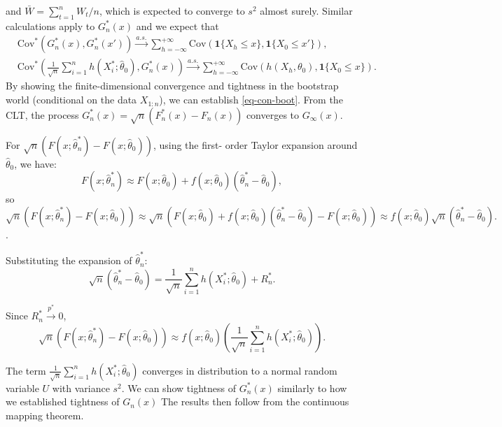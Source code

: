 \documentclass[11pt]{article}
\begin{document}
and $\bar{W}=\sum^{n}_{t=1}W_t/n$,
which is expected to converge to $s^2$ almost surely. Similar calculations apply to $G_n^*(x)$ and we expect that
\begin{align*}
&\text{Cov}^*(G_n^*(x),G_n^*(x'))\overset{a.s.}{\rightarrow}   \sum^{+\infty}_{h=-\infty}\text{Cov}(\mathbf{1}\{X_{h}\leq x\},\mathbf{1}\{X_0\leq x'\}),\\
&\text{Cov}^*\left(\frac{1}{\sqrt{n}}\sum^{n}_{i=1}h(X_i^*;\hat{\theta}_0), G_n^*(x)\right)\overset{a.s.}{\rightarrow} \sum^{+\infty}_{h=-\infty}\text{Cov}(h(X_{h},\theta_0),\mathbf{1}\{X_0\leq x\}).
\end{align*}
By showing the finite-dimensional convergence and tightness in the bootstrap world (conditional on the data $X_{1:n}$), we can establish \eqref{eq-con-boot}.
From the CLT, the process $G_n^*(x) = \sqrt{n}(F_n^*(x) - F_n(x))$ converges 
to 
$G_{\infty}(x)$.

For $\sqrt{n}(F(x;\hat{\theta}_n^*) - F(x;\hat{\theta}_0))$, using the first-
order Taylor 
expansion around $\hat{\theta}_0$, we have:
\[
F(x;\hat{\theta}_n^*) \approx F(x;\hat{\theta}_0) + f(x; 
\hat{\theta}_0) (\hat{\theta}_n^* - \hat{\theta}_0),
\] so
\[
\sqrt{n}(F(x;\hat{\theta}_n^*) - F(x;\hat{\theta}_0)) \approx \sqrt{n} 
(F(x;\hat{\theta}_0) + f(x; 
\hat{\theta}_0) (\hat{\theta}_n^* - \hat{\theta}_0) - F(x;\hat{\theta}_0)) 
\approx
f(x; 
\hat{\theta}_0) \sqrt{n} (\hat{\theta}_n^* - \hat{\theta}_0).
\].

Substituting the expansion of $\hat{\theta}_n^*$:
\[
\sqrt{n} (\hat{\theta}_n^* - \hat{\theta}_0) = \frac{1}{\sqrt{n}} \sum_{i=1}^{n} 
h(X_i^*; \hat{\theta}_0) + R_n^*.
\]

Since $R_n^* \overset{p^*}{\rightarrow} 0$, 
\[
\sqrt{n}(F(x;\hat{\theta}_n^*) - F(x;\hat{\theta}_0)) \approx 
f(x; \hat{\theta}_0) \left( \frac{1}{\sqrt{n}} \sum_{i=1}^{n} h(X_i^*; 
\hat{\theta}_0) \right).
\]

The term $\frac{1}{\sqrt{n}} \sum_{i=1}^{n} h(X_i^*; \hat{\theta}_0)$ 
converges in distribution to a normal random variable $U$ with variance 
$s^2$.
We can show tightness of $G_n^*(x)$ similarly to how we established 
tightness of $G_n(x)$
The results then follow from the continuous mapping theorem.



% 
%
\end{document}
